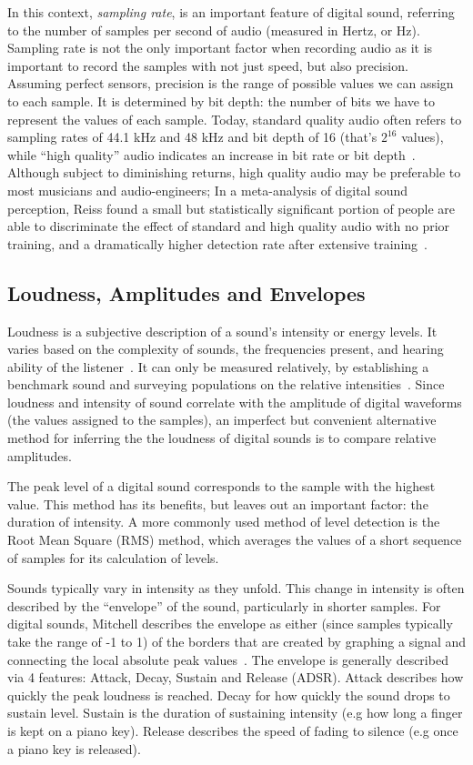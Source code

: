 \documentclass[runningheads,a4paper]{llncs}
\begin{document}
In this context, \textit{sampling rate}, is an important feature of digital sound, referring to the number of samples per second of audio (measured in Hertz, or Hz). Sampling rate is not the only important factor when recording audio as it is important to record the samples with not just speed, but also precision. Assuming perfect sensors, precision is the range of possible values we can assign to each sample. It is determined by bit depth: the number of bits we have to represent the values of each sample.  Today, standard quality audio often refers to sampling rates of 44.1 kHz and 48 kHz and bit depth of 16 (that's $2^{16}$ values), while \enquote{high quality} audio indicates an increase in bit rate or bit depth~\cite{reiss2016meta}. Although subject to diminishing returns, high quality audio may be preferable to most musicians and audio-engineers; In a meta-analysis of digital sound perception, Reiss found a small but statistically significant portion of people are able to discriminate the effect of standard and high quality audio with no prior training, and a dramatically higher detection rate after extensive training~\cite{reiss2016meta}. 


\subsection{Loudness, Amplitudes and Envelopes}
Loudness is a subjective description of a sound's intensity or energy levels. It varies based on the complexity of sounds, the frequencies present, and hearing ability of the listener~\cite{fletcher1933loudness,cook1999chap6}. It can only be measured relatively, by establishing a benchmark sound and surveying populations on the relative intensities~\cite{cook1999chap6}. Since loudness and intensity of sound correlate with the amplitude of digital waveforms (the values assigned to the samples), an imperfect but convenient alternative method for inferring the the loudness of digital sounds is to compare relative amplitudes. 

The peak level of a digital sound corresponds to the sample with the highest value. This method has its benefits, but leaves out an important factor: the duration of intensity. A more commonly used method of level detection is the Root Mean Square (RMS) method, which averages the values of a short sequence of samples for its calculation of levels.

Sounds typically vary in intensity as they unfold. This change in intensity is often described by the \enquote{envelope} of the sound, particularly in shorter samples. For digital sounds, Mitchell describes the envelope as either (since samples typically take the range of -1 to 1) of the borders that are created by graphing a signal and connecting the local absolute peak values~\cite{mitchell2009basicsynthChap6}. The envelope is generally described via 4 features: Attack, Decay, Sustain and Release (ADSR). Attack describes how quickly the peak loudness is reached. Decay for how quickly the sound drops to sustain level. Sustain is the duration of sustaining intensity (e.g how long a finger is kept on a piano key). Release describes the speed of fading to silence (e.g once a piano key is released).
\end{document}
